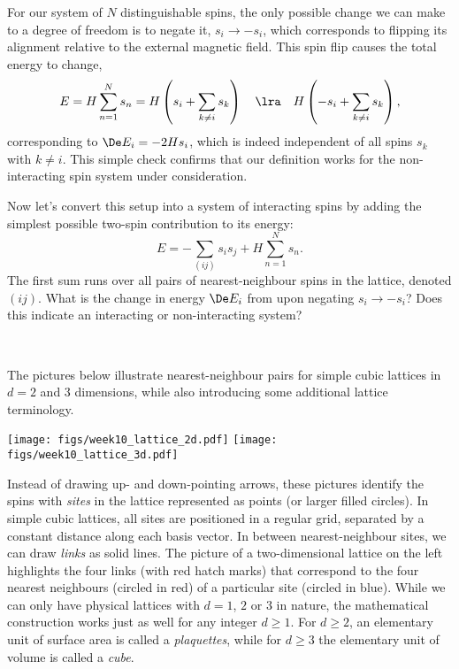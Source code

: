 For our system of $N$ distinguishable spins, the only possible change we can make to a degree of freedom is to negate it, $s_i \to -s_i$, which corresponds to flipping its alignment relative to the external magnetic field.
This spin flip causes the total energy to change,
\begin{equation*}
  E = H \sum_{n = 1}^N s_n = H\left(s_i + \sum_{k \ne i} s_k\right) \quad \lra \quad H\left(-s_i + \sum_{k \ne i} s_k\right),
\end{equation*}
corresponding to $\De E_i = -2H s_i$, which is indeed independent of all spins $s_k$ with $k \ne i$.
This simple check confirms that our definition works for the non-interacting spin system under consideration.

Now let's convert this setup into a system of interacting spins by adding the simplest possible two-spin contribution to its energy:
\begin{equation}
  \label{eq:Ising_energy}
  E = -\sum_{(ij)} s_i s_j + H \sum_{n = 1}^N s_n.
\end{equation}
The first sum runs over all pairs of nearest-neighbour spins in the lattice, denoted $(ij)$.
What is the change in energy $\De E_i$ from  upon negating $s_i \to -s_i$?
Does this indicate an interacting or non-interacting system?
\begin{mdframed}
  \ \\[100 pt]
\end{mdframed}
The pictures below illustrate nearest-neighbour pairs for simple cubic lattices in $d = 2$ and $3$ dimensions, while also introducing some additional lattice terminology.

\begin{center}
  \texttt{[image: figs/week10\_lattice\_2d.pdf]}\hfill
  \texttt{[image: figs/week10\_lattice\_3d.pdf]}
\end{center}

Instead of drawing up- and down-pointing arrows, these pictures identify the spins with \textit{sites} in the lattice represented as points (or larger filled circles).
In simple cubic lattices, all sites are positioned in a regular grid, separated by a constant distance along each basis vector.
In between nearest-neighbour sites, we can draw \textit{links} as solid lines.
The picture of a two-dimensional lattice on the left highlights the four links (with red hatch marks) that correspond to the four nearest neighbours (circled in red) of a particular site (circled in blue).
While we can only have physical lattices with $d = 1$, $2$ or $3$ in nature, the mathematical construction works just as well for any integer $d \geq 1$.
For $d \geq 2$, an elementary unit of surface area is called a \textit{plaquettes}, while for $d \geq 3$ the elementary unit of volume is called a \textit{cube}.

